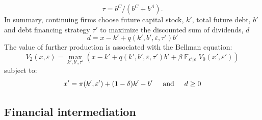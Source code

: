 \documentclass[12pt]{article}
\DeclareMathOperator{\E}{\mathbb{E}}
\begin{document}
\begin{equation}
    \tau = b^C/(b^C+b^A).
\end{equation}
In summary, continuing firms choose future capital stock, $k'$, total future debt, $b'$ and debt financing strategy $\tau'$ to maximize the discounted sum of dividends, $d$ 
\begin{equation} \label{eq:dividends}
d = x - k' +  q(k',b',\varepsilon, \tau')b'
\end{equation} 
The value of further production is associated with the Bellman equation: 
\begin{equation} 
    V_2(x,\varepsilon) = \max_{k',b', \tau'} \left(x - k' +  q(k',b',\varepsilon, \tau')b' + \beta \E_{\varepsilon'|\varepsilon} V_0(x',\varepsilon') \right)
\end{equation}
subject to: 
\begin{equation}
x' = \pi(k',\varepsilon')+(1-\delta)k'-b' \hspace{5mm} \text{and} \hspace{5mm} d \geq 0
\end{equation}

\subsection{Financial intermediation}
\end{document}
